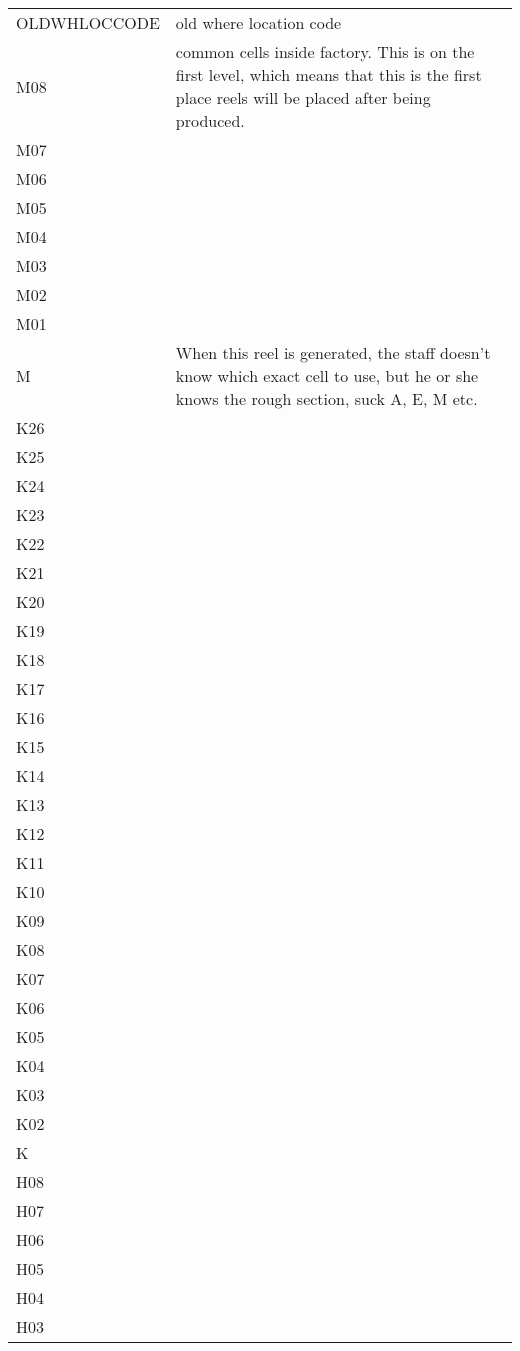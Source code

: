 \documentclass[a4paper]{report}
\begin{document}
\newpage
\begin{longtable}{| p{4cm} | p{10cm} |}
	OLDWHLOCCODE & old where location code \\

	M08 & common cells inside factory. This is on the first level, which means that this is the first place reels will be placed after being produced.  
	\\
	M07 &  \\
	M06 &  \\
	M05 &  \\
	M04 &  \\
	M03 &  \\
	M02 &  \\
	M01 &  \\
	M   &  When this reel is generated, the staff doesn't know which exact cell to use, but he or she knows the rough section, suck A, E, M etc.\\
	K26 &  \\
	K25 &  \\
	K24 &  \\
	K23 &  \\
	K22 &  \\
	K21 &  \\
	K20 &  \\
	K19 &  \\
	K18 &  \\
	K17 &  \\
	K16 &  \\
	K15 &  \\
	K14 &  \\
	K13 &  \\
	K12 &  \\
	K11 &  \\
	K10 &  \\
	K09 &  \\
	K08 &  \\
	K07 &  \\
	K06 &  \\
	K05 &  \\
	K04 &  \\
	K03 &  \\
	K02 &  \\
	K   &  \\
	H08 &  \\
	H07 &  \\
	H06 &  \\
	H05 &  \\
	H04 &  \\
	H03 &  \\

\end{longtable}
\end{document}
